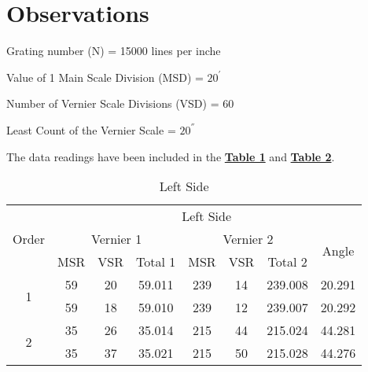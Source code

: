 
\section{Observations}

	Grating number (N) = 15000 lines per inche

	Value of 1 Main Scale Division (MSD) = $20^{'}$

	Number of Vernier Scale Divisions (VSD) = $60$

	Least Count of the Vernier Scale = $ 20^{''}$

	\vspace{3mm}
	The data readings have been included in the \hyperref[table:l]{\textbf{Table 1}} and \hyperref[table:r]{\textbf{Table 2}}.


\begin{table}[ht]
	\centering
	\begin{tabular}{|c|ccccccc|}
		\hline
		\multirow{3}{*}{Order}           &
		\multicolumn{7}{c|}{Left   Side}   \\ \cline{2-8}
		                                 &
		\multicolumn{3}{c|}{Vernier   1} &
		\multicolumn{3}{c|}{Vernier 2}   &
		\multirow{2}{*}{Angle}          \\ \cline{2-7}
		                                 &
		\multicolumn{1}{c|}{MSR}         &
		\multicolumn{1}{c|}{VSR}         &
		\multicolumn{1}{c|}{Total 1}     &
		\multicolumn{1}{c|}{MSR}         &
		\multicolumn{1}{c|}{VSR}         &
		\multicolumn{1}{c|}{Total 2}     &
		\\ \hline
		\multirow{2}{*}{1}               &
		\multicolumn{1}{c|}{59}          &
		\multicolumn{1}{c|}{20}          &
		\multicolumn{1}{c|}{59.011}      &
		\multicolumn{1}{c|}{239}         &
		\multicolumn{1}{c|}{14}          &
		\multicolumn{1}{c|}{239.008}     &
		20.291                             \\ \cline{2-8}
		                                 &
		\multicolumn{1}{c|}{59}          &
		\multicolumn{1}{c|}{18}          &
		\multicolumn{1}{c|}{59.010}      &
		\multicolumn{1}{c|}{239}         &
		\multicolumn{1}{c|}{12}          &
		\multicolumn{1}{c|}{239.007}     &
		20.292                             \\ \hline
		\multirow{2}{*}{2}               &
		\multicolumn{1}{c|}{35}          &
		\multicolumn{1}{c|}{26}          &
		\multicolumn{1}{c|}{35.014}      &
		\multicolumn{1}{c|}{215}         &
		\multicolumn{1}{c|}{44}          &
		\multicolumn{1}{c|}{215.024}     &
		44.281                             \\ \cline{2-8}
		                                 &
		\multicolumn{1}{c|}{35}          &
		\multicolumn{1}{c|}{37}          &
		\multicolumn{1}{c|}{35.021}      &
		\multicolumn{1}{c|}{215}         &
		\multicolumn{1}{c|}{50}          &
		\multicolumn{1}{c|}{215.028}     &
		44.276                             \\ \hline
	\end{tabular}
	\caption{Left Side}
	\label{table:l}
\end{table}

